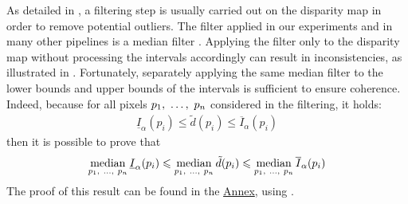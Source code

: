 As detailed in , a filtering step is usually carried out on the disparity map in order to remove potential outliers. The filter applied in our experiments and in many other pipelines is a median filter \cite{scharstein_taxonomy_2001}. Applying the filter only to the disparity map without processing the intervals accordingly can result in inconsistencies, as illustrated in . Fortunately, separately applying the same median filter to the lower bounds and upper bounds of the intervals is sufficient to ensure coherence. Indeed, because for all pixels $p_1, ~\ldots, ~ p_n$ considered in the filtering, it holds:
\begin{align}
    \underline{I}_\alpha(p_i)\leqslant \tilde{d}(p_i) \leqslant \overline{I}_\alpha(p_i)
\end{align}
then it is possible to prove that
\begin{align}
    \operatorname*{median}_{p_1, ~\ldots, ~ p_n} \underline{I}_\alpha(p_i)\leqslant \operatorname*{median}_{p_1, ~\ldots, ~ p_n}\tilde{d}(p_i) \leqslant \operatorname*{median}_{p_1, ~\ldots, ~ p_n}\overline{I}_\alpha(p_i)
\end{align}
The proof of this result can be found in the \hyperref[chap:annex]{Annex}, using .

